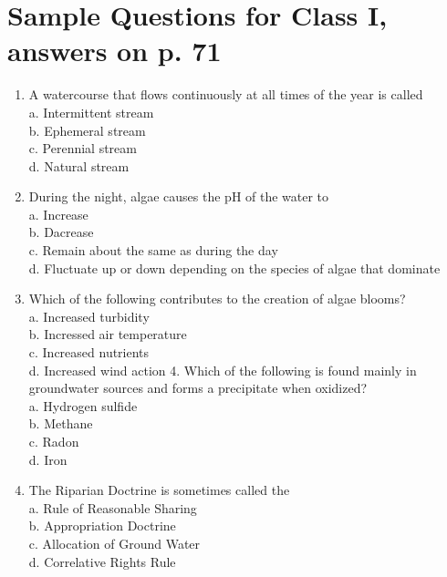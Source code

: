 \documentclass[10pt]{article}
\begin{document}
\section{Sample Questions for Class I, answers on p. 71}
\begin{enumerate}
  \item A watercourse that flows continuously at all times of the year is called\\
a. Intermittent stream\\
b. Ephemeral stream\\
c. Perennial stream\\
d. Natural stream

  \item During the night, algae causes the $\mathrm{pH}$ of the water to\\
a. Increase\\
b. Dacrease\\
c. Remain about the same as during the day\\
d. Fluctuate up or down depending on the species of algae that dominate

  \item Which of the following contributes to the creation of algae blooms?\\
a. Increased turbidity\\
b. Incressed air temperature\\
c. Increased nutrients\\
d. Increased wind action 4. Which of the following is found mainly in groundwater sources and forms a precipitate when oxidized?\\
a. Hydrogen sulfide\\
b. Methane\\
c. Radon\\
d. Iron

  \item The Riparian Doctrine is sometimes called the\\
a. Rule of Reasonable Sharing\\
b. Appropriation Doctrine\\
c. Allocation of Ground Water\\
d. Correlative Rights Rule\\


\end{enumerate}
\end{document}
